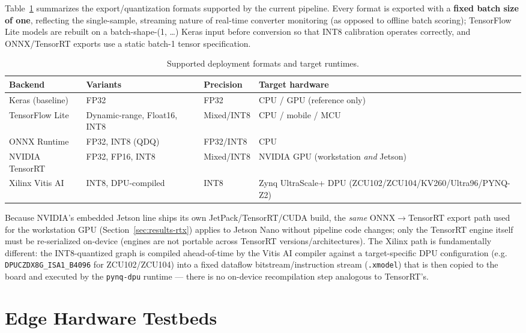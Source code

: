\documentclass[11pt,a4paper]{article}
\begin{document}
Table~\ref{tab:formats} summarizes the export/quantization formats supported by the
current pipeline. Every format is exported with a \textbf{fixed batch size of one},
reflecting the single-sample, streaming nature of real-time converter monitoring (as
opposed to offline batch scoring); TensorFlow Lite models are rebuilt on a
batch-shape-(1, \ldots) Keras input before conversion so that INT8 calibration operates
correctly, and ONNX/TensorRT exports use a static batch-1 tensor specification.

\begin{table}[ht]
\centering
\caption{Supported deployment formats and target runtimes.}
\label{tab:formats}
\begin{tabular}{@{}llll@{}}
\toprule
Backend & Variants & Precision & Target hardware \\
\midrule
Keras (baseline) & FP32 & FP32 & CPU / GPU (reference only) \\
TensorFlow Lite & Dynamic-range, Float16, INT8 & Mixed/INT8 & CPU / mobile / MCU \\
ONNX Runtime & FP32, INT8 (QDQ) & FP32/INT8 & CPU \\
NVIDIA TensorRT & FP32, FP16, INT8 & Mixed/INT8 & NVIDIA GPU (workstation \emph{and} Jetson) \\
Xilinx Vitis AI & INT8, DPU-compiled & INT8 & Zynq UltraScale+ DPU (ZCU102/ZCU104/KV260/Ultra96/PYNQ-Z2) \\
\bottomrule
\end{tabular}
\end{table}

Because NVIDIA's embedded Jetson line ships its own JetPack/TensorRT/CUDA build, the
\emph{same} ONNX$\to$TensorRT export path used for the workstation GPU
(Section~\ref{sec:results-rtx}) applies to Jetson Nano without pipeline code changes; only
the TensorRT engine itself must be re-serialized on-device (engines are not portable
across TensorRT versions/architectures). The Xilinx path is fundamentally different: the
INT8-quantized graph is compiled ahead-of-time by the Vitis AI compiler against a
target-specific DPU configuration (e.g. \texttt{DPUCZDX8G\_ISA1\_B4096} for
ZCU102/ZCU104) into a fixed dataflow bitstream/instruction stream (\texttt{.xmodel})
that is then copied to the board and executed by the \texttt{pynq-dpu} runtime --- there
is no on-device recompilation step analogous to TensorRT's.

\section{Edge Hardware Testbeds}
\label{sec:hardware}
\end{document}
